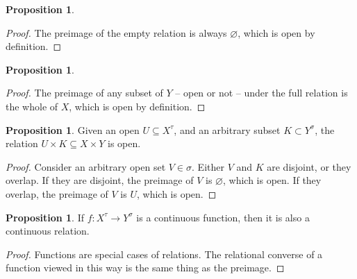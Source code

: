 \documentclass{tufte-handout}
\theoremstyle{definition}
\newtheorem{proposition}[theorem]{Proposition}
\newtheorem{rem}[theorem]{Reminder}
\begin{document}

\begin{proposition}
\label{prop:emptyrel}
\begin{proof}
The preimage of the empty relation is always $\varnothing$, which is open by definition.
\end{proof}
\end{proposition}

\begin{proposition}
\label{prop:fullrel}
\begin{proof}
The preimage of any subset of $Y$ -- open or not -- under the full relation is the whole of $X$, which is open by definition.
\end{proof}
\end{proposition}

\begin{proposition}\label{prop:bowtie}
Given an open $U \subseteq X^\tau$, and an arbitrary subset $K \subset Y^\sigma$, the relation $U \times K \subseteq X \times Y$ is open.
\begin{proof}
Consider an arbitrary open set $V \in \sigma$. Either $V$ and $K$ are disjoint, or they overlap. If they are disjoint, the preimage of $V$ is $\varnothing$, which is open. If they overlap, the preimage of $V$ is $U$, which is open.
\end{proof}
\end{proposition}

\begin{proposition}\label{prop:func}
If $f: X^\tau \rightarrow Y^\sigma$ is a continuous function, then it is also a continuous relation.
\begin{proof}
Functions are special cases of relations. The relational converse of a function viewed in this way is the same thing as the preimage.
\end{proof}
\end{proposition}
\end{document}

